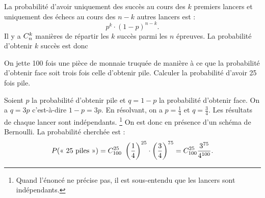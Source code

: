                         La probabilit\'e d'avoir 
                        uniquement des succ\`es au cours des $k$ premiers lancers
                        et uniquement des \'echecs au cours des $n-k$ autres lancers est : 
                              \begin{displaymath}
                                    p^k \cdot (1-p)^{n-k}.
                              \end{displaymath}
                        Il y a $C_{n}^{k}$ mani\`eres de r\'epartir les $k$ succ\`es parmi les $n$ \'epreuves.
                        La probabilit\'e d'obtenir $k$ succ\`es est donc 
                        \begin{ex}
                              On jette 100 fois une pi\`ece de monnaie truqu\'ee de mani\`ere \`a ce que 
                              la probabilit\'e d'obtenir face soit trois fois celle d'obtenir pile. \newline
                              Calculer la probabilit\'e d'avoir 25 fois pile.
                              \begin{valiny}
                                    Soient $p$ la probabilit\'e d'obtenir pile et $q = 1-p$ 
                                    la probabilit\'e d'obtenir face.
                                    On a $q = 3 p $ c'est-\`a-dire $1-p = 3p$.
                                    En r\'esolvant, on a $p = \frac{1}{4}$ et $q = \frac{3}{4}$.
                                    Les r\'esultats de chaque lancer sont ind\'ependants.
                                    \footnote{Quand l'\'enonc\'e ne pr\'ecise pas,
                                    il est sous-entendu que les lancers sont ind\'ependants.}
                                    On est donc en pr\'esence d'un sch\'ema de Bernoulli.
                                    La probabilit\'e cherch\'ee est :
                                    \begin{displaymath}
                                          P(\text{<< 25 piles >>}) 
                                                = \C{100}{25}\ \left(\frac{1}{4}\right)^{25} \cdot \left(\frac{3}{4}\right)^{75}
                                                = \C{100}{25} \frac{3^{75}}{4^{100}}.
                                    \end{displaymath}
                              \end{valiny}
                        \end{ex}

